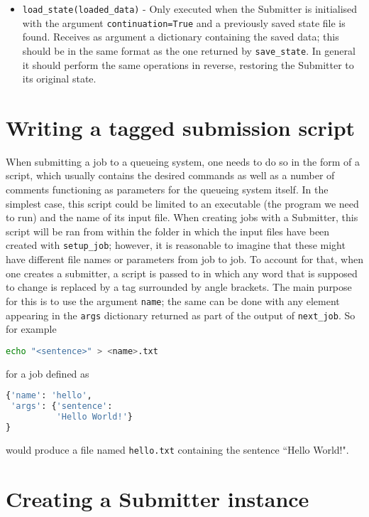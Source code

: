 \documentclass[]{report}
\begin{document}
\begin{itemize}
	\item \lstinline|load_state(loaded_data)| - Only executed when the Submitter is initialised with the argument \lstinline|continuation=True| and a previously saved state file is found. Receives as argument a dictionary containing the saved data; this should be in the same format as the one returned by \lstinline|save_state|. In general it should perform the same operations in reverse, restoring the Submitter to its original state.
\end{itemize}

\section{Writing a tagged submission script}

When submitting a job to a queueing system, one needs to do so in the form of a script, which usually contains the desired commands as well as a number of comments functioning as parameters for the queueing system itself. In the simplest case, this script could be limited to an executable (the program we need to run) and the name of its input file. When creating jobs with a Submitter, this script will be ran from within the folder in which the input files have been created with \lstinline|setup_job|; however, it is reasonable to imagine that these might have different file names or parameters from job to job. To account for that, when one creates a submitter, a script is passed to in which any word that is supposed to change is replaced by a tag surrounded by angle brackets. The main purpose for this is to use the argument \lstinline|name|; the same can be done with any element appearing in the \lstinline|args| dictionary returned as part of the output of \lstinline|next_job|. So for example

\begin{lstlisting}[language=bash]
echo "<sentence>" > <name>.txt
\end{lstlisting}

for a job defined as 

\begin{lstlisting}[language=python]
{'name': 'hello', 
 'args': {'sentence': 
          'Hello World!'}
}
\end{lstlisting}

would produce a file named \lstinline|hello.txt| containing the sentence ``Hello World!".

\section{Creating a Submitter instance}\label{subm_instance}
\end{document}
